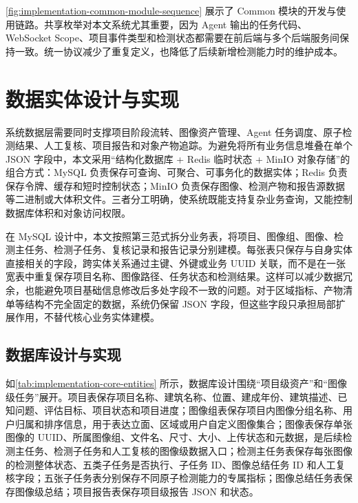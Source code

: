 \cref{fig:implementation-common-module-sequence} 展示了 Common 模块的开发与使用链路。共享枚举对本文系统尤其重要，因为 Agent 输出的任务代码、WebSocket Scope、项目事件类型和检测状态都需要在前后端与多个后端服务间保持一致。统一协议减少了重复定义，也降低了后续新增检测能力时的维护成本。

\section{数据实体设计与实现}
\label{sec:implementation-data-entity-design-and-implementation}

系统数据层需要同时支撑项目阶段流转、图像资产管理、Agent 任务调度、原子检测结果、人工复核、项目报告和对象产物追踪。为避免将所有业务信息堆叠在单个 JSON 字段中，本文采用“结构化数据库 + Redis 临时状态 + MinIO 对象存储”的组合方式：MySQL 负责保存可查询、可聚合、可事务化的数据实体；Redis 负责保存令牌、缓存和短时控制状态；MinIO 负责保存图像、检测产物和报告源数据等二进制或大体积文件。三者分工明确，使系统既能支持复杂业务查询，又能控制数据库体积和对象访问权限。

在 MySQL 设计中，本文按照第三范式拆分业务表，将项目、图像组、图像、检测主任务、检测子任务、复核记录和报告记录分别建模。每张表只保存与自身实体直接相关的字段，跨实体关系通过主键、外键或业务 UUID 关联，而不是在一张宽表中重复保存项目名称、图像路径、任务状态和检测结果。这样可以减少数据冗余，也能避免项目基础信息修改后多处字段不一致的问题。对于区域指标、产物清单等结构不完全固定的数据，系统仍保留 JSON 字段，但这些字段只承担局部扩展作用，不替代核心业务实体建模。

\subsection{数据库设计与实现}
\label{subsec:implementation-database-design-and-implementation}

如\cref{tab:implementation-core-entities} 所示，数据库设计围绕“项目级资产”和“图像级任务”展开。项目表保存项目名称、建筑名称、位置、建成年份、建筑描述、已知问题、评估目标、项目状态和项目进度；图像组表保存项目内图像分组名称、用户归属和排序信息，用于表达立面、区域或用户自定义图像集合；图像表保存单张图像的 UUID、所属图像组、文件名、尺寸、大小、上传状态和元数据，是后续检测主任务、检测子任务和人工复核的图像级数据入口；检测主任务表保存每张图像的检测整体状态、五类子任务是否执行、子任务 ID、图像总结任务 ID 和人工复核字段；五张子任务表分别保存不同原子检测能力的专属指标；图像总结任务表保存图像级总结；项目报告表保存项目级报告 JSON 和状态。

